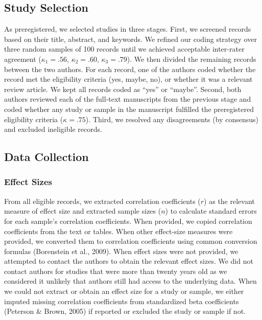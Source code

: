 \documentclass[12pt, letterpaper]{article}
\begin{document}
\hypertarget{study-selection}{%
\subsection{Study Selection}\label{study-selection}}

As preregistered, we selected studies in three stages. First, we
screened records based on their title, abstract, and keywords. We
refined our coding strategy over three random samples of 100 records
until we achieved acceptable inter-rater agreement (\(\kappa_1 = .56\),
\(\kappa_2 = .60\), \(\kappa_3 = .79\)). We then divided the remaining
records between the two authors. For each record, one of the authors
coded whether the record met the eligibility criteria (yes, maybe, no),
or whether it was a relevant review article. We kept all records coded
as ``yes'' or ``maybe''. Second, both authors reviewed each of the
full-text manuscripts from the previous stage and coded whether any
study or sample in the manuscript fulfilled the preregistered
eligibility criteria (\(\kappa = .75\)). Third, we resolved any
disagreements (by consensus) and excluded ineligible records.

\hypertarget{data-collection}{%
\subsection{Data Collection}\label{data-collection}}

\hypertarget{effect-sizes}{%
\subsubsection{Effect Sizes}\label{effect-sizes}}

From all eligible records, we extracted correlation coefficients (\(r\))
as the relevant measure of effect size and extracted sample sizes
(\(n\)) to calculate standard errors for each sample's correlation
coefficients. When provided, we copied correlation coefficients from the
text or tables. When other effect-size measures were provided, we
converted them to correlation coefficients using common conversion
formulas (Borenstein et al., 2009). When effect sizes were not provided,
we attempted to contact the authors to obtain the relevant effect sizes.
We did not contact authors for studies that were more than twenty years
old as we considered it unlikely that authors still had access to the
underlying data. When we could not extract or obtain an effect size for
a study or sample, we either imputed missing correlation coefficients
from standardized beta coefficients (Peterson \& Brown, 2005) if
reported or excluded the study or sample if not.
\end{document}
